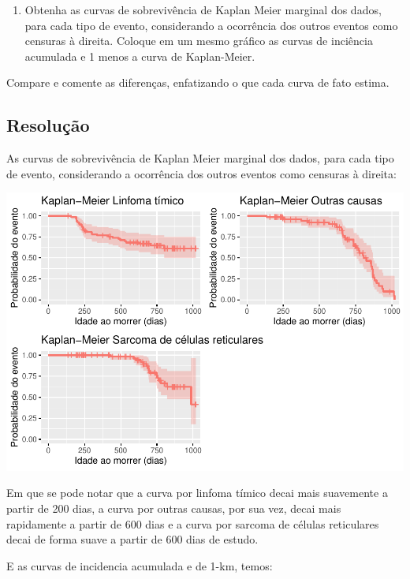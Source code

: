 \documentclass[]{article}
\providecommand{\tightlist}{%
  \setlength{\itemsep}{0pt}\setlength{\parskip}{0pt}}
\begin{document}
\begin{enumerate}
\def\labelenumi{(\alph{enumi})}
\setcounter{enumi}{3}
\tightlist
\item
  Obtenha as curvas de sobrevivência de Kaplan Meier marginal dos dados,
  para cada tipo de evento, considerando a ocorrência dos outros eventos
  como censuras à direita. Coloque em um mesmo gráfico as curvas de
  inciência acumulada e 1 menos a curva de Kaplan-Meier.
\end{enumerate}

Compare e comente as diferenças, enfatizando o que cada curva de fato
estima.

\subsection{Resolução}\label{resolucao-9}

As curvas de sobrevivência de Kaplan Meier marginal dos dados, para cada
tipo de evento, considerando a ocorrência dos outros eventos como
censuras à direita:

\begin{center}\includegraphics[width=0.8\linewidth]{Lista_5_files/figure-latex/unnamed-chunk-22-1} \end{center}

Em que se pode notar que a curva por linfoma tímico decai mais
suavemente a partir de 200 dias, a curva por outras causas, por sua vez,
decai mais rapidamente a partir de 600 dias e a curva por sarcoma de
células reticulares decai de forma suave a partir de 600 dias de estudo.

E as curvas de incidencia acumulada e de 1-km, temos:
\end{document}
